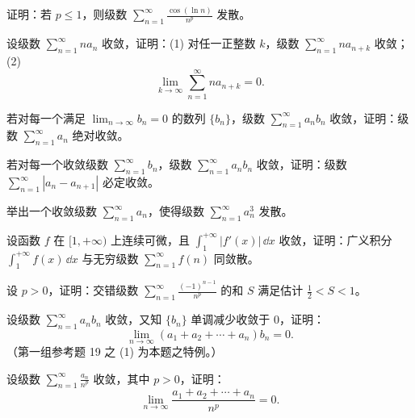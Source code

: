 \begin{xreferenceproblem}[9]
证明：若 $p\leq1$，则级数 $\sum_{n=1}^{\infty}\frac{\cos(\ln n)}{n^p}$ 发散。
\end{xreferenceproblem}

\begin{xreferenceproblem}[10]
设级数 $\sum_{n=1}^{\infty}na_n$ 收敛，证明：(1) 对任一正整数 $k$，级数 $\sum_{n=1}^{\infty}na_{n+k}$ 收敛；(2)
\[
\lim_{k\to\infty}\sum_{n=1}^{\infty}na_{n+k}=0.
\]
\end{xreferenceproblem}

\begin{xreferenceproblem}[11]
若对每一个满足 $\lim_{n\to\infty}b_n=0$ 的数列 $\{b_n\}$，级数 $\sum_{n=1}^{\infty}a_nb_n$ 收敛，证明：级数 $\sum_{n=1}^{\infty}a_n$ 绝对收敛。
\end{xreferenceproblem}

\begin{xreferenceproblem}[12]
若对每一个收敛级数 $\sum_{n=1}^{\infty}b_n$，级数 $\sum_{n=1}^{\infty}a_nb_n$ 收敛，证明：级数 $\sum_{n=1}^{\infty}|a_n-a_{n+1}|$ 必定收敛。
\end{xreferenceproblem}

\begin{xreferenceproblem}[13]
举出一个收敛级数 $\sum_{n=1}^{\infty}a_n$，使得级数 $\sum_{n=1}^{\infty}a_n^3$ 发散。
\end{xreferenceproblem}

\begin{xreferenceproblem}[14]
设函数 $f$ 在 $[1,+\infty)$ 上连续可微，且 $\int_1^{+\infty}|f'(x)|\,\dd x$ 收敛，证明：广义积分 $\int_1^{+\infty}f(x)\,\dd x$ 与无穷级数 $\sum_{n=1}^{\infty}f(n)$ 同敛散。
\end{xreferenceproblem}

\begin{xreferenceproblem}[15]
设 $p>0$，证明：交错级数 $\sum_{n=1}^{\infty}\frac{(-1)^{n-1}}{n^p}$ 的和 $S$ 满足估计 $\frac12<S<1$。
\end{xreferenceproblem}

\begin{xreferenceproblem}[16]
设级数 $\sum_{n=1}^{\infty}a_nb_n$ 收敛，又知 $\{b_n\}$ 单调减少收敛于 0，证明：
\[
\lim_{n\to\infty}(a_1+a_2+\cdots+a_n)b_n=0.
\]
（第一组参考题 19 之 (1) 为本题之特例。）
\end{xreferenceproblem}

\begin{xreferenceproblem}[17]
设级数 $\sum_{n=1}^{\infty}\frac{a_n}{n^p}$ 收敛，其中 $p>0$，证明：
\[
\lim_{n\to\infty}\frac{a_1+a_2+\cdots+a_n}{n^p}=0.
\]
\end{xreferenceproblem}

